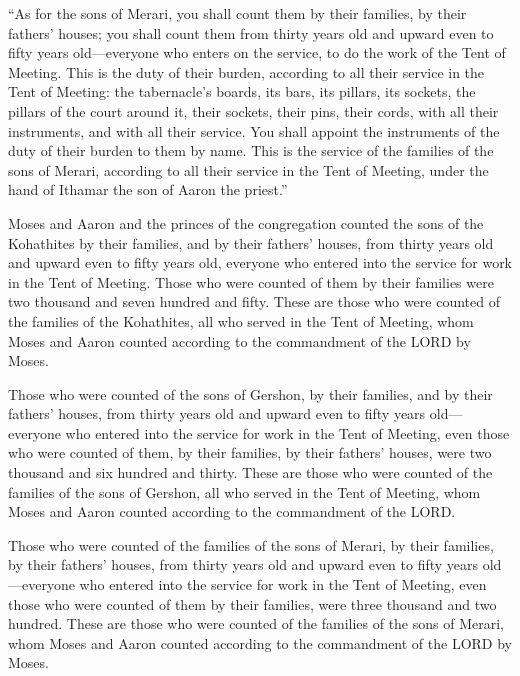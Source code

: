  ``As for the sons of Merari, you shall count them by
their families, by their fathers' houses;  you shall
count them from thirty years old and upward even to fifty years
old---everyone who enters on the service, to do the work of the Tent of
Meeting.  This is the duty of their burden, according to
all their service in the Tent of Meeting: the tabernacle's boards, its
bars, its pillars, its sockets,  the pillars of the court
around it, their sockets, their pins, their cords, with all their
instruments, and with all their service. You shall appoint the
instruments of the duty of their burden to them by name. 
This is the service of the families of the sons of Merari, according to
all their service in the Tent of Meeting, under the hand of Ithamar the
son of Aaron the priest.''

 Moses and Aaron and the princes of the congregation
counted the sons of the Kohathites by their families, and by their
fathers' houses,  from thirty years old and upward even
to fifty years old, everyone who entered into the service for work in
the Tent of Meeting.  Those who were counted of them by
their families were two thousand and seven hundred and fifty.
 These are those who were counted of the families of the
Kohathites, all who served in the Tent of Meeting, whom Moses and Aaron
counted according to the commandment of the LORD by Moses.

 Those who were counted of the sons of Gershon, by their
families, and by their fathers' houses,  from thirty
years old and upward even to fifty years old---everyone who entered into
the service for work in the Tent of Meeting,  even those
who were counted of them, by their families, by their fathers' houses,
were two thousand and six hundred and thirty.  These are
those who were counted of the families of the sons of Gershon, all who
served in the Tent of Meeting, whom Moses and Aaron counted according to
the commandment of the LORD.

 Those who were counted of the families of the sons of
Merari, by their families, by their fathers' houses, 
from thirty years old and upward even to fifty years old---everyone who
entered into the service for work in the Tent of Meeting,
 even those who were counted of them by their families,
were three thousand and two hundred.  These are those who
were counted of the families of the sons of Merari, whom Moses and Aaron
counted according to the commandment of the LORD by Moses.

